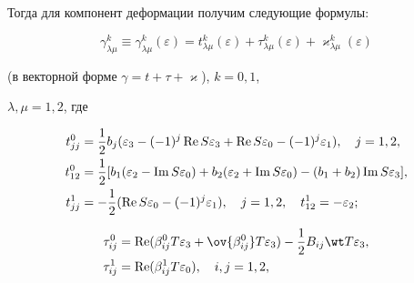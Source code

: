 Тогда для компонент деформации получим следующие формулы: 


\begin{equation} 


\gamma^k_{\lambda\mu}\equiv \gamma^k_{\lambda\mu}(\varepsilon)= 


t^k_{\lambda\mu}(\varepsilon)+\tau^k_{\lambda\mu}(\varepsilon)+ 


\varkappa^k_{\lambda\mu}(\varepsilon) 


\end{equation} 


(в векторной форме $\gamma=t+\tau+\varkappa$), $k=0,1$, 


$\lambda,\mu=1,2$, где 


\begin{equation} 


\begin{split} 


t^0_{jj}&=\frac{1}{2}b_j(\varepsilon_3-(-1)^j 


\re S\varepsilon_3+\re S \varepsilon_0-(-1)^j 


\varepsilon_1),\quad j=1,2,\\ 


% 


t^0_{12}&=\frac{1}{2}[b_1(\varepsilon_2-\im S \varepsilon_0)+ 


b_2(\varepsilon_2+\im S \varepsilon_0)-(b_1+b_2) 


\im S \varepsilon_3],\\ 


% 


t^1_{jj}&=-\frac{1}{2}(\re S \varepsilon_0-(-1)^j \varepsilon_1), 


\quad j=1,2,\quad t^1_{12}=-\varepsilon_2; 


\end{split} 


\end{equation} 


\begin{equation} 


\begin{split} 


\tau^0_{i j}&=\re (\beta^0_{i j}T \varepsilon_3+ 


\ov{\beta^0_{i j}}T \varepsilon_3)-\frac{1}{2} 


B_{ i j}\wt T \varepsilon_3, \\ 


% 


\tau^1_{i j}&=\re(\beta^1_{i j}T \varepsilon_0),\quad i,j=1,2, 


\end{split} 


\end{equation} 


